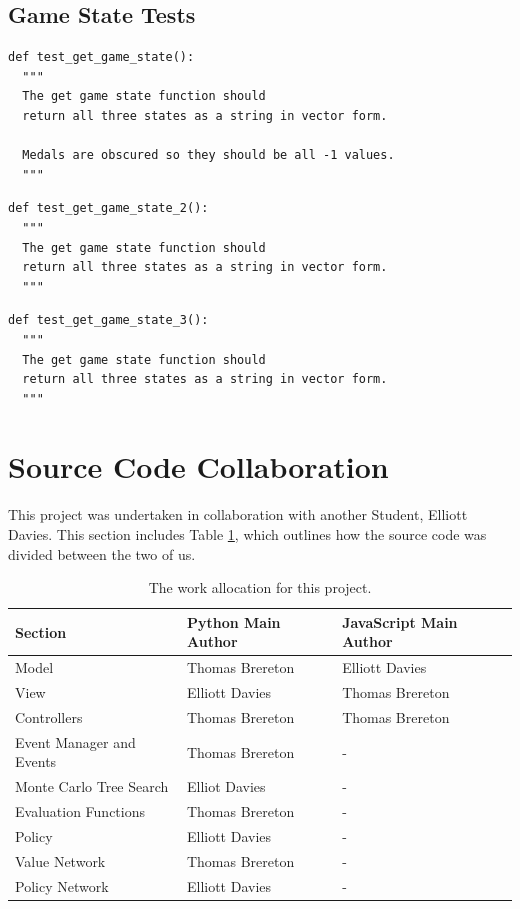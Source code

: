\documentclass{bhamthesis}
\theoremstyle{definition}
\begin{document}
\subsection{Game State Tests}

\begin{verbatim}
def test_get_game_state():
  """
  The get game state function should
  return all three states as a string in vector form.

  Medals are obscured so they should be all -1 values.
  """
\end{verbatim}

\begin{verbatim}
def test_get_game_state_2():
  """
  The get game state function should
  return all three states as a string in vector form.
  """
\end{verbatim}

\begin{verbatim}
def test_get_game_state_3():
  """
  The get game state function should
  return all three states as a string in vector form.
  """
\end{verbatim}

\section{Source Code Collaboration}
This project was undertaken in collaboration with another Student, Elliott Davies. This section includes Table \ref{t:sourceCode}, which outlines how the source code was divided between the two of us.

\begin{table}[]
	\centering
	\caption{The work allocation for this project.}
	\label{t:sourceCode}
	\begin{tabular}{lll}
		\hline
		Section                  & Python Main Author & JavaScript Main Author \\ \hline
		Model                    & Thomas Brereton    & Elliott Davies         \\
		View                     & Elliott Davies     & Thomas Brereton        \\
		Controllers              & Thomas Brereton    & Thomas Brereton        \\
		Event Manager and Events & Thomas Brereton    & -                      \\
		Monte Carlo Tree Search  & Elliot Davies      & -                      \\
		Evaluation Functions     & Thomas Brereton    & -                      \\
		Policy                   & Elliott Davies     & -                      \\
		Value Network            & Thomas Brereton    & -                      \\
		Policy Network           & Elliott Davies     & -                     
	\end{tabular}
\end{table}
\end{document}
